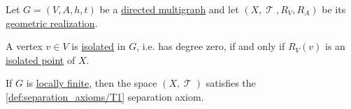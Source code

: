 \begin{proposition}\label{thm:def:graph_geometric_realization}
  Let \( G = (V, A, h, t) \) be a \hyperref[def:directed_multigraph]{directed multigraph} and let \( (X, \mscrT, R_V, R_A) \) be its \hyperref[def:graph_geometric_realization]{geometric realization}.

  \begin{thmenum}
     A vertex \( v \in V \) is \hyperref[def:isolated_vertex]{isolated} in \( G \), i.e. has degree zero, if and only if \( R_V(v) \) is an \hyperref[def:set_cluster_point]{isolated point} of \( X \).

     If \( G \) is \hyperref[def:graph_cardinality/local]{locally finite}, then the space \( (X, \mscrT) \) satisfies the \ref{def:separation_axioms/T1} separation axiom.
  \end{thmenum}
\end{proposition}
